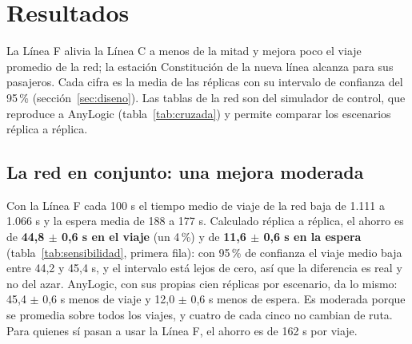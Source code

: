 \documentclass{article}
\begin{document}
\section{Resultados}
\label{sec:resultados}

La Línea F alivia la Línea C a menos de la mitad y mejora poco el viaje promedio de la red; la estación
Constitución de la nueva línea alcanza para sus pasajeros. Cada cifra es la media de las réplicas con su
intervalo de confianza del 95\,\% (sección~\ref{sec:diseno}). Las tablas de la red son del simulador de
control, que reproduce a AnyLogic (tabla~\ref{tab:cruzada}) y permite comparar los escenarios réplica a
réplica.

\subsection{La red en conjunto: una mejora moderada}

Con la Línea F cada 100 s el tiempo medio de viaje de la red baja de 1.111 a 1.066 s y la espera media de 188
a 177 s. Calculado réplica a réplica, el ahorro es de \textbf{44,8 $\pm$ 0,6 s en el viaje} (un 4\,\%) y de
\textbf{11,6 $\pm$ 0,6 s en la espera} (tabla~\ref{tab:sensibilidad}, primera fila): con 95\,\% de confianza
el viaje medio baja entre 44,2 y 45,4 s, y el intervalo está lejos de cero, así que la diferencia es real y no
del azar. AnyLogic, con sus propias cien réplicas por escenario, da lo mismo: 45,4 $\pm$ 0,6 s menos de viaje
y 12,0 $\pm$ 0,6 s menos de espera. Es moderada porque se promedia sobre todos los viajes, y cuatro de cada cinco no cambian de ruta. Para quienes sí pasan a
usar la Línea F, el ahorro es de 162 s por viaje.
\end{document}

